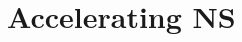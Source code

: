\documentclass[aspectratio=169, 11pt]{beamer}
\begin{document}


%     



\section{Accelerating NS}
\end{document}
